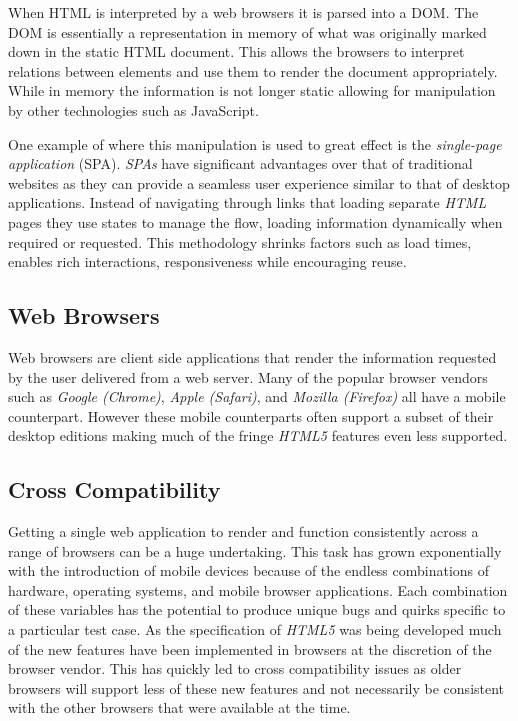\documentclass[final]{cmpreport}
\begin{document}
When HTML is interpreted by a web browsers it is parsed into a DOM. The DOM is essentially a representation in memory of what was originally marked down in the static HTML document. This allows the browsers to interpret relations between elements and use them to render the document appropriately. While in memory the information is not longer static allowing for manipulation by other technologies such as JavaScript.

One example of where this manipulation is used to great effect is the \textit{single-page application} (SPA). \textit{SPAs} have significant advantages over that of traditional websites as they can provide a seamless user experience similar to that of desktop applications. Instead of navigating through links that loading separate \textit{HTML} pages they use states to manage the flow, loading information dynamically when required or requested. This methodology shrinks factors such as load times, enables rich interactions, responsiveness while encouraging reuse. \citep{Takada}

\subsection{Web Browsers}
Web browsers are client side applications that render the information requested by the user delivered from a web server. Many of the popular browser vendors such as \textit{Google (Chrome)}, \textit{Apple (Safari)}, and \textit{Mozilla (Firefox)} all have a mobile counterpart. However these mobile counterparts often support a subset of their desktop editions making much of the fringe \textit{HTML5} features even less supported.

\subsection{Cross Compatibility}
Getting a single web application to render and function consistently across a range of browsers can be a huge undertaking. This task has grown exponentially with the introduction of mobile devices because of the endless combinations of hardware, operating systems, and mobile browser applications. Each combination of these variables has the potential to produce unique bugs and quirks specific to a particular test case. As the specification of \textit{HTML5} was being developed much of the new features have been implemented in browsers at the discretion of the browser vendor. This has quickly led to cross compatibility issues as older browsers will support less of these new features and not necessarily be consistent with the other browsers that were available at the time.
\end{document}
